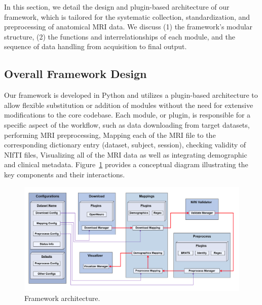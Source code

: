 In this section, we detail the design and plugin-based architecture of our framework, which is tailored for the 
systematic collection, standardization, and preprocessing of anatomical MRI data. We discuss (1) the framework's 
modular structure, (2) the functions and interrelationships of each module, and the sequence of data handling 
from acquisition to final output. 

\subsection{Overall Framework Design}

Our framework is developed in Python and utilizes a plugin-based architecture to allow flexible 
substitution or addition of modules without the need for extensive modifications to the core codebase. Each module, 
or plugin, is responsible for a specific aspect of the workflow, such as data downloading from target datasets, 
performing MRI preprocessing, Mapping each of the MRI file to the corresponding dictionary entry (dataset, subject, session),
checking validity of NIfTI files, Visualizing all of the MRI data as well as 
integrating demographic and clinical metadata. 
Figure~\ref{fig:SystemArchitecture} provides a conceptual diagram illustrating the key components and their interactions.


\begin{figure}[htbp]\begin{center}\includegraphics[width=\linewidth]{figures/architecture.png}
    \caption{
        Framework architecture.
    }
    \label{fig:SystemArchitecture}\end{center}
\end{figure}



